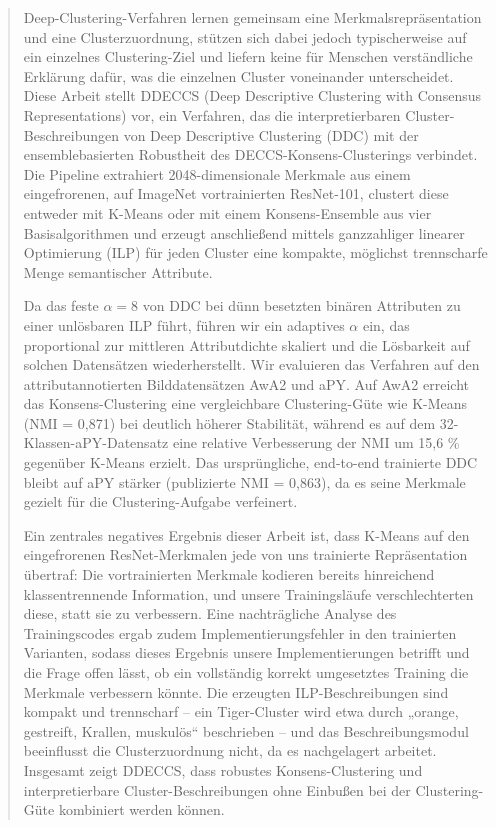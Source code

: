 \documentclass[12pt,a4paper]{report}
\begin{document}
\renewcommand{\abstractname}{Zusammenfassung}
\begin{abstract}
    Deep-Clustering-Verfahren lernen gemeinsam eine Merkmalsrepräsentation und eine
    Clusterzuordnung, stützen sich dabei jedoch typischerweise auf ein einzelnes
    Clustering-Ziel und liefern keine für Menschen verständliche Erklärung dafür, was
    die einzelnen Cluster voneinander unterscheidet. Diese Arbeit stellt DDECCS (Deep
    Descriptive Clustering with Consensus Representations) vor, ein Verfahren, das die
    interpretierbaren Cluster-Beschreibungen von Deep Descriptive Clustering (DDC) mit
    der ensemblebasierten Robustheit des DECCS-Konsens-Clusterings verbindet. Die
    Pipeline extrahiert 2048-dimensionale Merkmale aus einem eingefrorenen, auf ImageNet
    vortrainierten ResNet-101, clustert diese entweder mit K-Means oder mit einem
    Konsens-Ensemble aus vier Basisalgorithmen und erzeugt anschließend mittels
    ganzzahliger linearer Optimierung (ILP) für jeden Cluster eine kompakte, möglichst
    trennscharfe Menge semantischer Attribute.

    Da das feste $\alpha = 8$ von DDC bei dünn besetzten binären Attributen zu einer
    unlösbaren ILP führt, führen wir ein adaptives $\alpha$ ein, das proportional zur
    mittleren Attributdichte skaliert und die Lösbarkeit auf solchen Datensätzen
    wiederherstellt. Wir evaluieren das Verfahren auf den attributannotierten
    Bilddatensätzen AwA2 und aPY. Auf AwA2 erreicht das Konsens-Clustering eine
    vergleichbare Clustering-Güte wie K-Means (NMI = 0{,}871) bei deutlich höherer
    Stabilität, während es auf dem 32-Klassen-aPY-Datensatz eine relative Verbesserung der
    NMI um 15,6 \% gegenüber K-Means erzielt. Das ursprüngliche, end-to-end trainierte DDC
    bleibt auf aPY stärker (publizierte NMI = 0{,}863), da es seine Merkmale gezielt für
    die Clustering-Aufgabe verfeinert.

    Ein zentrales negatives Ergebnis dieser Arbeit ist, dass K-Means auf den
    eingefrorenen ResNet-Merkmalen jede von uns trainierte Repräsentation übertraf: Die
    vortrainierten Merkmale kodieren bereits hinreichend klassentrennende Information,
    und unsere Trainingsläufe verschlechterten diese, statt sie zu verbessern. Eine
    nachträgliche Analyse des Trainingscodes ergab zudem Implementierungsfehler in den
    trainierten Varianten, sodass dieses Ergebnis unsere Implementierungen betrifft und
    die Frage offen lässt, ob ein vollständig korrekt umgesetztes Training die Merkmale
    verbessern könnte. Die erzeugten
    ILP-Beschreibungen sind kompakt und trennscharf -- ein Tiger-Cluster wird etwa durch
    „orange, gestreift, Krallen, muskulös“ beschrieben -- und das Beschreibungsmodul
    beeinflusst die Clusterzuordnung nicht, da es nachgelagert arbeitet. Insgesamt zeigt
    DDECCS, dass robustes Konsens-Clustering und interpretierbare Cluster-Beschreibungen
    ohne Einbußen bei der Clustering-Güte kombiniert werden können.
\end{abstract}
\end{document}
